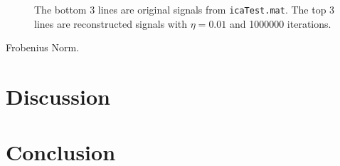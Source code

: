 \documentclass[10pt]{article}
\begin{document}
\begin{figure}
\caption{The bottom 3 lines are original signals from
\texttt{icaTest.mat}. The top 3 lines are reconstructed signals with
$\eta = 0.01$ and 1000000 iterations.}
\label{fig:rep}
\end{figure}

Frobenius Norm.

\section{Discussion}

\section{Conclusion}
\end{document}
